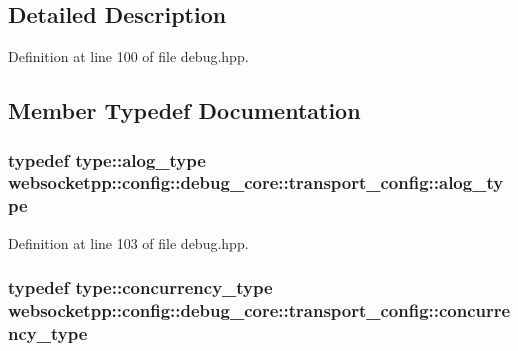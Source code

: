 \subsection{Detailed Description}


Definition at line 100 of file debug.\+hpp.



\subsection{Member Typedef Documentation}
\hypertarget{structwebsocketpp_1_1config_1_1debug__core_1_1transport__config_a400180c9d501bcdac92a42eee2e233e6}{}
\subsubsection[{alog\+\_\+type}]{\setlength{\rightskip}{0pt plus 5cm}typedef {\bf type\+::alog\+\_\+type} {\bf websocketpp\+::config\+::debug\+\_\+core\+::transport\+\_\+config\+::alog\+\_\+type}}\label{structwebsocketpp_1_1config_1_1debug__core_1_1transport__config_a400180c9d501bcdac92a42eee2e233e6}


Definition at line 103 of file debug.\+hpp.

\hypertarget{structwebsocketpp_1_1config_1_1debug__core_1_1transport__config_a3dcd0e3cfc508d9a7e1c096735915f36}{}
\subsubsection[{concurrency\+\_\+type}]{\setlength{\rightskip}{0pt plus 5cm}typedef {\bf type\+::concurrency\+\_\+type} {\bf websocketpp\+::config\+::debug\+\_\+core\+::transport\+\_\+config\+::concurrency\+\_\+type}}\label{structwebsocketpp_1_1config_1_1debug__core_1_1transport__config_a3dcd0e3cfc508d9a7e1c096735915f36}


